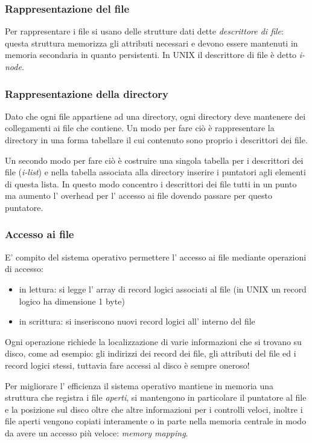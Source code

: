 {\subsubsection{Rappresentazione del file}
Per rappresentare i file si usano delle strutture dati dette \emph{descrittore di file}: questa struttura memorizza gli attributi necessari e devono essere mantenuti in memoria secondaria in quanto persistenti.
In UNIX il descrittore di file è detto \emph{i-node}.

\subsubsection{Rappresentazione della directory}
Dato che ogni file appartiene ad una directory, ogni directory deve mantenere dei collegamenti ai file che contiene.
Un modo per fare ciò è rappresentare la directory in una forma tabellare il cui contenuto sono proprio i descrittori dei file.

Un secondo modo per fare ciò è costruire una singola tabella per i descrittori dei file (\emph{i-list}) e nella tabella associata alla directory inserire i puntatori agli elementi di questa lista.
In questo modo concentro i descrittori dei file tutti in un punto ma aumento l' overhead per l' accesso ai file dovendo passare per questo puntatore.

\subsubsection{Accesso ai file}
E' compito del sistema operativo permettere l' accesso ai file mediante operazioni di accesso:
\begin{itemize}
    \item in lettura: si legge l' array di record logici associati al file (in UNIX un record logico ha dimensione 1 byte)
    \item in scrittura: si inseriscono nuovi record logici all' interno del file
\end{itemize}
Ogni operazione richiede la localizzazione di varie informazioni che si trovano su disco, come ad esempio: gli indirizzi dei record dei file, gli attributi del file ed i record logici stessi, tuttavia fare accessi al disco è sempre oneroso!

Per migliorare l' efficienza il sistema operativo mantiene in memoria una struttura che registra i file \emph{aperti}, si mantengono in particolare il puntatore al file e la posizione sul disco oltre che altre informazioni per i controlli veloci, inoltre i file aperti vengono copiati interamente o in parte nella memoria centrale in modo da avere un accesso più veloce: \emph{memory mapping}.

}
